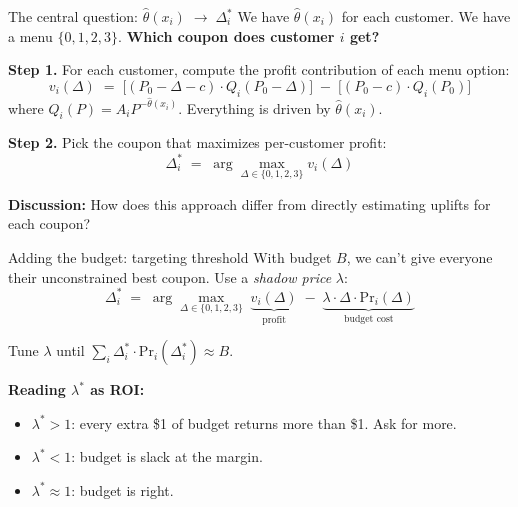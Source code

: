 \documentclass[aspectratio=169, 11pt, handout]{beamer}
\newcommand{\Prob}{\mathrm{Pr}}
\begin{document}
\begin{frame}{The central question: $\hat\theta(x_i) \;\longrightarrow\; \Delta_i^*$}
We have $\hat\theta(x_i)$ for each customer. We have a menu $\{0, 1, 2, 3\}$. \textbf{Which coupon does customer $i$ get?}
\vspace{0.6em}

\textbf{Step 1.} For each customer, compute the profit contribution of each menu option:
\[
v_i(\Delta) \;=\; \big[(P_0 - \Delta - c) \cdot Q_i(P_0 - \Delta)\big] \;-\; \big[(P_0 - c) \cdot Q_i(P_0)\big]
\]
where $Q_i(P) = A_i P^{-\hat\theta(x_i)}$. Everything is driven by $\hat\theta(x_i)$.
\vspace{0.6em}

\textbf{Step 2.} Pick the coupon that maximizes per-customer profit:
\[
\Delta_i^* \;=\; \arg\max_{\Delta \in \{0, 1, 2, 3\}} v_i(\Delta)
\]
\vspace{0.4em}

\textbf{Discussion:} How does this approach differ from directly estimating uplifts for each coupon?

\end{frame}

\begin{frame}{Adding the budget: targeting threshold}
With budget $B$, we can't give everyone their unconstrained best coupon. Use a \emph{shadow price} $\lambda$:
\[
\Delta_i^* \;=\; \arg\max_{\Delta \in \{0, 1, 2, 3\}} \; \underbrace{v_i(\Delta)}_{\text{profit}} \;-\; \underbrace{\lambda \cdot \Delta \cdot \Prob_i(\Delta)}_{\text{budget cost}}
\]
\vspace{0.2em}

Tune $\lambda$ until $\sum_i \Delta_i^* \cdot \Prob_i(\Delta_i^*) \approx B$.
\vspace{0.6em}

\textbf{Reading $\lambda^*$ as ROI:}
\begin{itemize}
    \item $\lambda^* > 1$: every extra \$1 of budget returns more than \$1. Ask for more.
    \item $\lambda^* < 1$: budget is slack at the margin.
    \item $\lambda^* \approx 1$: budget is right.
\end{itemize}

\end{frame}
\end{document}
